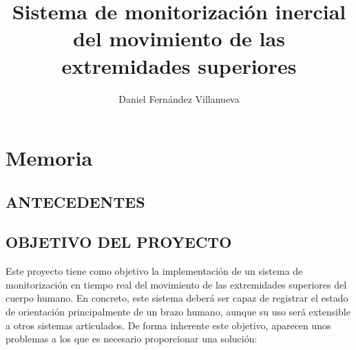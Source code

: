 \documentclass[12pt, a4paper]{report}
\author{Daniel Fernández Villanueva}
\title{\huge Sistema de monitorización inercial del movimiento de las extremidades superiores}
\begin{document}
\maketitle

\tableofcontents

\listoffigures

\listoftables


\part{Memoria}

\pagestyle{headings}



\chapter{ANTECEDENTES}



\chapter{OBJETIVO DEL PROYECTO}

Este proyecto tiene como objetivo la implementación de un sistema de monitorización en tiempo real del movimiento de las extremidades superiores del cuerpo humano. En concreto, este sistema deberá ser capaz de registrar el estado de orientación principalmente de un brazo humano, aunque su uso será extensible a otros sistemas articulados. De forma inherente este objetivo, aparecen unos problemas a los que es necesario proporcionar una solución: 
\end{document}
